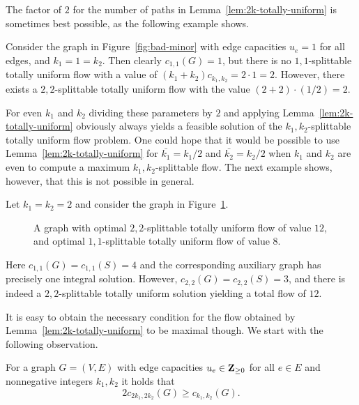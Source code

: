The factor of $2$ for the number of paths in
Lemma~\ref{lem:2k-totally-uniform} is sometimes best possible, as the
following example shows.
\begin{example}
  Consider the graph in Figure~\ref{fig:bad-minor} with edge
  capacities $u_e=1$ for all edges, and $k_1=1=k_2$. Then clearly
  $c_{1,1}(G)=1$, but there is no $1,1$-splittable totally uniform
  flow with a value of $(k_1+k_2)c_{k_1,k_2}=2\cdot 1=2$. However,
  there exists a $2,2$-splittable totally uniform flow with the value
  $(2+2)\cdot(1/2)=2$.
\end{example}

For even $k_1$ and $k_2$ dividing these parameters by $2$ and applying
Lemma~\ref{lem:2k-totally-uniform} obviously always yields a feasible
solution of the $k_1,k_2$-splittable totally uniform flow problem.
One could hope that it would be possible to use
Lemma~\ref{lem:2k-totally-uniform} for $\bar{k_1}=k_1/2$ and
$\bar{k_2}=k_2/2$ when $k_1$ and $k_2$ are even to compute a
maximum $k_1,k_2$-splittable flow. The next example shows, however,
that this is not possible in general.


\begin{example}
 Let $k_1=k_2=2$ and consider the graph in
  Figure~\ref{fig:factor-2}.
  \begin{figure}
    \begin{center}
    \end{center}
    \caption{A graph with optimal $2,2$-splittable totally uniform
      flow of value $12$, and optimal $1,1$-splittable totally uniform
      flow of value $8$.}
    \label{fig:factor-2}
  \end{figure}
  Here $c_{1,1}(G)=c_{1,1}(S)=4$ and the corresponding
  auxiliary graph has precisely one integral solution. However,
  $c_{2,2}(G)=c_{2,2}(S)=3$, and there is indeed a $2,2$-splittable totally
  uniform solution yielding a total flow of $12$.
\end{example}

It is easy to obtain the necessary condition for the flow obtained by
Lemma~\ref{lem:2k-totally-uniform} to be maximal though. We start with
the following observation.

\begin{observation}
  For a graph $G=(V,E)$ with edge capacities $u_e\in\mathbf{Z}_{\geq 0}$ for
  all $e\in E$ and nonnegative integers $k_1,k_2$ it holds that
  \begin{equation}
    \label{eq:ck-ck/2}
    2 c_{2k_1,2k_2}(G)\geq c_{k_1,k_2}(G).    
  \end{equation}
\end{observation}

